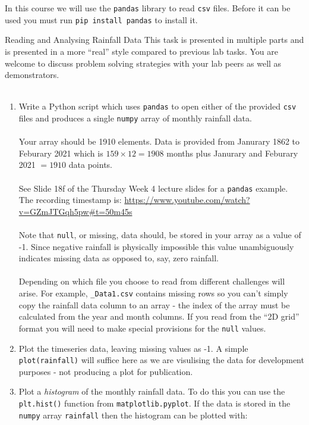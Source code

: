 \documentclass{lab}
\begin{document}
In this course we will use the \texttt{pandas} library to read \texttt{csv} files. Before it can be used you must run \texttt{pip install pandas} to install it.

\pagebreak
\begin{task}{Reading and Analysing Rainfall Data}{}
This task is presented in multiple parts and is presented in a more ``real'' style compared to previous lab tasks. You are welcome to discuss problem solving strategies with your lab peers as well as demonstrators.
\\~
\begin{enumerate}
\item Write a Python script which uses \texttt{pandas} to open either of the provided \texttt{csv} files and produces a single \texttt{numpy} array of monthly rainfall data.
\\~\\
Your array should be 1910 elements. Data is provided from Janurary 1862 to Feburary 2021 which is $159\times 12 = 1908$ months plus Janurary and Feburary 2021 $=1910$ data points.
\\~\\
See Slide 18f of the Thursday Week 4 lecture slides for a \texttt{pandas} example. The recording timestamp is: \url{https://www.youtube.com/watch?v=GZmJTGqh5pw#t=50m45s}
\\~\\
Note that \texttt{null}, or missing, data should, be stored in your array as a value of -1. Since negative rainfall is physically impossible this value unambiguously indicates missing data as opposed to, say, zero rainfall.
\\~\\
Depending on which file you choose to read from different challenges will arise. For example, \texttt{\_Data1.csv} contains missing rows so you can't simply copy the rainfall data column to an array - the index of the array must be calculated from the year and month columns. If you read from the ``2D grid'' format you will need to make special provisions for the \texttt{null} values.

\item Plot the timeseries data, leaving missing values as -1. A simple \texttt{plot(rainfall)} will suffice here as we are visulising the data for development purposes - not producing a plot for publication.

\item Plot a \textit{histogram} of the monthly rainfall data. To do this you can use the \texttt{plt.hist()} function from \texttt{matplotlib.pyplot}. If the data is stored in the \texttt{numpy} array \texttt{rainfall} then the histogram can be plotted with:


\end{enumerate}
\end{task}
\end{document}

